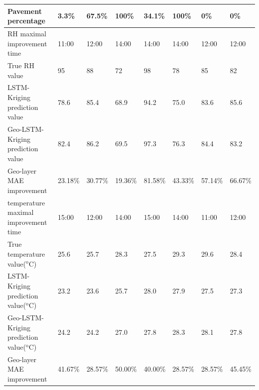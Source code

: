 \documentclass[a4paper,fleqn]{cas-sc}
\begin{document}
\begin{table}[width=.9\linewidth,cols=4,pos=h]
\begin{tabular*}{\tblwidth}{@{} LLLLLLLL@{} }
Pavement percentage &3.3\% &67.5\% &100\%& 34.1\% &100\% &0\% &0\%\\
\midrule
RH maximal improvement time & 11:00 & 12:00 & 14:00 & 14:00 &  14:00& 12:00 & 12:00\\
True RH value & 95 & 88 & 72& 98 & 78 &  85& 82 \\
LSTM-Kriging prediction value  & 78.6 & 85.4&68.9& 94.2 &75.0 & 83.6 & 85.6\\
Geo-LSTM-Kriging prediction value  & 82.4 & 86.2&69.5& 97.3 & 76.3 & 84.4 & 83.2\\
Geo-layer MAE improvement  & 23.18\% & 30.77\% & 19.36\%& 81.58\%  & 43.33\% & 57.14\% & 66.67\%\\
\midrule
temperature maximal improvement time  & 15:00 & 12:00 & 14:00& 15:00 & 14:00 & 11:00 & 12:00\\
True temperature value($^\text{o}$C) & 25.6 & 25.7 &28.3 & 27.5 & 29.3 & 29.6 & 28.4\\
LSTM-Kriging prediction value($^\text{o}$C) & 23.2&23.6 &25.7& 28.0 & 27.9 & 27.5&27.3\\
Geo-LSTM-Kriging prediction value($^\text{o}$C)&24.2& 24.2& 27.0& 27.8 & 28.3 &28.1& 27.8\\
Geo-layer MAE improvement &41.67\% & 28.57\% & 50.00\%& 40.00\%  & 28.57\%  &28.57\% & 45.45\%\\
\bottomrule
\end{tabular*}
\end{table}
\fi




\end{document}
